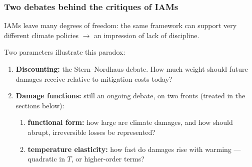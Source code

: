 \documentclass[xcolor=x11names,compress,aspectratio=169]{beamer}%
\makeatletter
\newenvironment{stepenumeratewithalert}{\begin{enumerate}[<+-| alert@+>]}{\end{enumerate}}
\newenvironment{stepitemizewithalert}{\begin{itemize}[<+-| alert@+>]}{\end{itemize} }
\renewenvironment{itemize}{\begin{compactitemize}[<+-| alert@+>]}{\end{compactitemize}}
\renewenvironment{stepitemizewithalert}{\begin{compactitemize}[<+-| alert@+>]}{\end{compactitemize}}
\renewenvironment{stepitemizewithalert}{\begin{itemize}}{\end{itemize}}
\renewenvironment{stepenumeratewithalert}{\begin{enumerate}}{\end{enumerate}}
\makeatother
\begin{document}
\begin{frame}%
%

\frametitle{Two debates behind the critiques of IAMs}%


\begin{stepitemizewithalert}
\item IAMs leave many degrees of freedom: the same framework can support very
different climate policies $\rightarrow$ an impression of lack of discipline.%
\vspace{2ex}%


\item Two parameters illustrate this paradox:%
\vspace{1.5ex}%


\begin{stepenumeratewithalert}
\item \textbf{Discounting:} the Stern--Nordhaus debate. How much weight should
future damages receive relative to mitigation costs today?%
\vspace{1.5ex}%


\item \textbf{Damage functions:} still an ongoing debate, on two fronts
(treated in the sections below):%
\vspace{1ex}%

\begin{stepenumeratewithalert}
\item \textbf{functional form:} how large are climate damages, and how
should abrupt, irreversible losses be represented?%
\vspace{1ex}%

\item \textbf{temperature elasticity:} how fast do damages rise with
warming --- quadratic in $T$, or higher-order terms?
\end{stepenumeratewithalert}
\end{stepenumeratewithalert}
\end{stepitemizewithalert}

%

\transboxout
\end{frame}%
\end{document}
